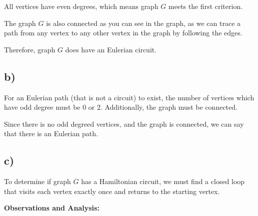 \documentclass[12pt]{article}
\begin{document}
All vertices have even degrees, which means graph \( G \) meets the first criterion.

The graph \( G \) is also connected as you can see in the graph, as we can trace a path from any vertex to any other vertex in the graph by following the edges.

Therefore, graph \( G \) does have an Eulerian circuit.


\subsection*{b)}

For an Eulerian path (that is not a circuit) to exist, the number of vertices which have odd degree must be 0 or 2. Additionally, the graph must be connected.

Since there is no odd degreed vertices, and the graph is connected, we can say that there is an Eulerian path.

\subsection*{c)}

To determine if graph \( G \) has a Hamiltonian circuit, we must find a closed loop that visits each vertex exactly once and returns to the starting vertex.

\textbf{Observations and Analysis:}
\end{document}
